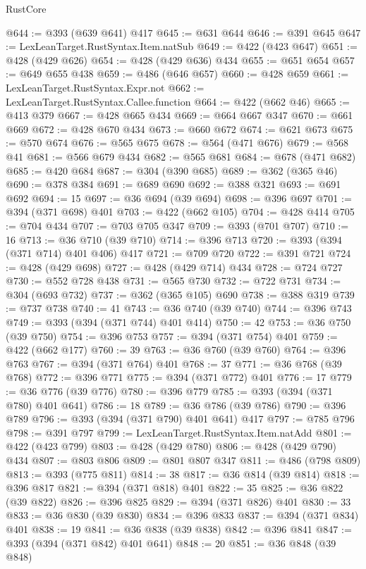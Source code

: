 \begin{lexlean}{RustCore}
\begin{coremodule}
@644 := @393 (@639 @641) @417
@645 := @631 @644
@646 := @391 @645
@647 := LexLeanTarget.RustSyntax.Item.natSub
@649 := @422 (@423 @647)
@651 := @428 (@429 @626)
@654 := @428 (@429 @636) @434
@655 := @651 @654
@657 := @649 @655 @438
@659 := @486 (@646 @657)
@660 := @428 @659
@661 := LexLeanTarget.RustSyntax.Expr.not
@662 := LexLeanTarget.RustSyntax.Callee.function
@664 := @422 (@662 @46)
@665 := @413 @379
@667 := @428 @665 @434
@669 := @664 @667 @347
@670 := @661 @669
@672 := @428 @670 @434
@673 := @660 @672
@674 := @621 @673
@675 := @570 @674
@676 := @565 @675
@678 := @564 (@471 @676)
@679 := @568 @41
@681 := @566 @679 @434
@682 := @565 @681
@684 := @678 (@471 @682)
@685 := @420 @684
@687 := @304 (@390 @685)
@689 := @362 (@365 @46)
@690 := @378 @384
@691 := @689 @690
@692 := @388 @321
@693 := @691 @692
@694 := 15
@697 := @36 @694 (@39 @694)
@698 := @396 @697
@701 := @394 (@371 @698) @401
@703 := @422 (@662 @105)
@704 := @428 @414
@705 := @704 @434
@707 := @703 @705 @347
@709 := @393 (@701 @707)
@710 := 16
@713 := @36 @710 (@39 @710)
@714 := @396 @713
@720 := @393 (@394 (@371 @714) @401 @406) @417
@721 := @709 @720
@722 := @391 @721
@724 := @428 (@429 @698)
@727 := @428 (@429 @714) @434
@728 := @724 @727
@730 := @552 @728 @438
@731 := @565 @730
@732 := @722 @731
@734 := @304 (@693 @732)
@737 := @362 (@365 @105) @690
@738 := @388 @319
@739 := @737 @738
@740 := 41
@743 := @36 @740 (@39 @740)
@744 := @396 @743
@749 := @393 (@394 (@371 @744) @401 @414)
@750 := 42
@753 := @36 @750 (@39 @750)
@754 := @396 @753
@757 := @394 (@371 @754) @401
@759 := @422 (@662 @177)
@760 := 39
@763 := @36 @760 (@39 @760)
@764 := @396 @763
@767 := @394 (@371 @764) @401
@768 := 37
@771 := @36 @768 (@39 @768)
@772 := @396 @771
@775 := @394 (@371 @772) @401
@776 := 17
@779 := @36 @776 (@39 @776)
@780 := @396 @779
@785 := @393 (@394 (@371 @780) @401 @641)
@786 := 18
@789 := @36 @786 (@39 @786)
@790 := @396 @789
@796 := @393 (@394 (@371 @790) @401 @641) @417
@797 := @785 @796
@798 := @391 @797
@799 := LexLeanTarget.RustSyntax.Item.natAdd
@801 := @422 (@423 @799)
@803 := @428 (@429 @780)
@806 := @428 (@429 @790) @434
@807 := @803 @806
@809 := @801 @807 @347
@811 := @486 (@798 @809)
@813 := @393 (@775 @811)
@814 := 38
@817 := @36 @814 (@39 @814)
@818 := @396 @817
@821 := @394 (@371 @818) @401
@822 := 35
@825 := @36 @822 (@39 @822)
@826 := @396 @825
@829 := @394 (@371 @826) @401
@830 := 33
@833 := @36 @830 (@39 @830)
@834 := @396 @833
@837 := @394 (@371 @834) @401
@838 := 19
@841 := @36 @838 (@39 @838)
@842 := @396 @841
@847 := @393 (@394 (@371 @842) @401 @641)
@848 := 20
@851 := @36 @848 (@39 @848)

\end{coremodule}
\end{lexlean}
